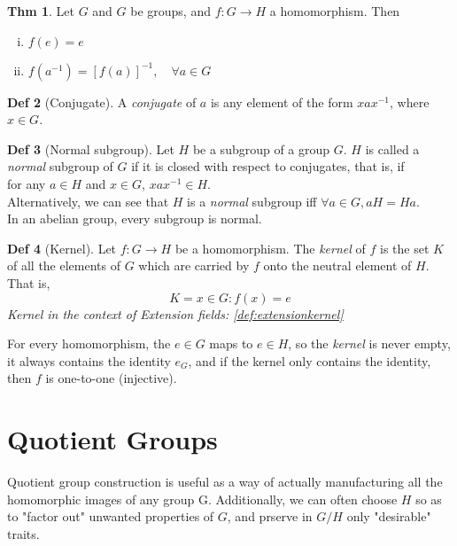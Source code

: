 \documentclass{article}
\theoremstyle{definition}
\newtheorem{definition}{Def}[section]
\newtheorem{theorem}[definition]{Thm}
\begin{document}
\begin{theorem}
    Let $G$ and $G$ be groups, and $f: G \rightarrow H$ a homomorphism. Then
    \begin{enumerate}[i.]
	\item $f(e) = e$
	\item $f(a^{-1}) = [f(a)]^{-1}, \quad \forall a \in G$
    \end{enumerate}
\end{theorem}

\begin{definition}[Conjugate]
    A \emph{conjugate} of $a$ is any element of the form $xax^{-1}$, where $x \in G$.
\end{definition}

\begin{definition}[Normal subgroup]
    Let $H$ be a subgroup of a group $G$. $H$ is called a \emph{normal} subgroup of $G$ if it is closed with respect to conjugates, that is, if\\
    for any $a \in H$ and $x \in G$, $xax^{-1} \in H$.
    \\
    Alternatively, we can see that $H$ is a \emph{normal} subgroup iff $\forall a \in G, aH = Ha$.
    \\
    In an abelian group, every subgroup is normal.
\end{definition}

\begin{definition}[Kernel]\label{def:homomorphismkernel}
    Let $f: G \rightarrow H$ be a homomorphism. The \emph{kernel} of $f$ is the set $K$ of all the elements of $G$ which are carried by $f$ onto the neutral element of $H$. That is,
    $$K = {x \in G : f(x) = e}$$
    \emph{Kernel in the context of Extension fields: \ref{def:extensionkernel}}
\end{definition}
For every homomorphism, the $e \in G$ maps to $e \in H$, so the \emph{kernel} is never empty, it always contains the identity $e_G$, and if the kernel only contains the identity, then $f$ is one-to-one (injective).


\section{Quotient Groups}

Quotient group construction is useful as a way of actually manufacturing all the homomorphic images of any group G. Additionally, we can often choose $H$ so as to "factor out" unwanted properties of $G$, and prserve in $G/H$ only "desirable" traits.
\end{document}
